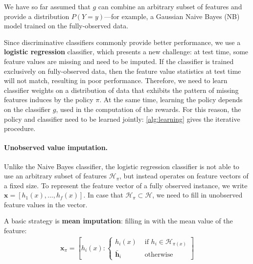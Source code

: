 We have so far assumed that $g$ can combine an arbitrary subset of features and provide a distribution $P(Y = y)$---for example, a Gaussian Naive Bayes (NB) model trained on the fully-observed data.

Since discriminative classifiers commonly provide better performance, we use a \textbf{logistic regression} classifier, which presents a new challenge:
at test time, some feature values are missing and need to be imputed.
If the classifier is trained exclusively on fully-observed data, then the feature value statistics at test time will not match, resulting in poor performance.
Therefore, we need to learn classifier weights on a distribution of data that exhibits the pattern of missing features induces by the policy $\pi$.
At the same time, learning the policy depends on the classifier $g$, used in the computation of the rewards.
For this reason, the policy and classifier need to be learned jointly: \autoref{alg:learning} gives the iterative procedure.

\paragraph{Unobserved value imputation.}
Unlike the Naive Bayes classifier, the logistic regression classifier is not able to use an arbitrary subset of features $\mathcal{H}_\pi$, but instead operates on feature vectors of a fixed size.
To represent the feature vector of a fully observed instance, we write $\mathbf{x} = [h_1(x), \dots, h_f(x)]$.
In case that $\mathcal{H}_\pi \subset \mathcal{H}$, we need to fill in unobserved feature values in the vector.

A basic strategy is \textbf{mean imputation}: filling in with the mean value of the feature:
\begin{align}
\mathbf{x}_\pi = \left[ h_i(x) : \left\{ \begin{array}{rl}
 h_i(x) &\mbox{ if $h_i \in \mathcal{H}_{\pi(x)}$} \\
 \bar{\mathbf{h}}_i &\mbox{ otherwise}
\end{array} \right. \right]
\end{align}

